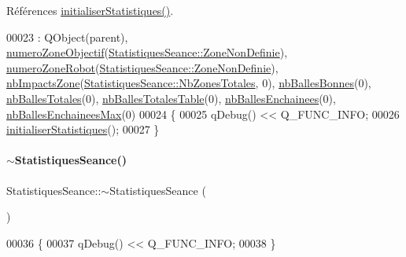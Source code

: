 Références \hyperlink{class_statistiques_seance_a17e1c49e2986a8490ff96e4bd7733291}{initialiser\+Statistiques()}.


\begin{DoxyCode}
00023                                                       : QObject(parent), 
      \hyperlink{class_statistiques_seance_a23226867e4a34cb41f8c07f3d8d42e49}{numeroZoneObjectif}(\hyperlink{class_statistiques_seance_aa839f5192cbadd7c3fb3651d62eff8b5afaee4b0051f413cbba9651905daeba28}{StatistiquesSeance::ZoneNonDefinie}),
       \hyperlink{class_statistiques_seance_aeea50e7fc9b2308e365f77f27e3f86ee}{numeroZoneRobot}(\hyperlink{class_statistiques_seance_aa839f5192cbadd7c3fb3651d62eff8b5afaee4b0051f413cbba9651905daeba28}{StatistiquesSeance::ZoneNonDefinie}), 
      \hyperlink{class_statistiques_seance_aa4a040cda282d5b1c250025f8e191e20}{nbImpactsZone}(\hyperlink{class_statistiques_seance_aa839f5192cbadd7c3fb3651d62eff8b5afe19f73563963b5160847cdd8c2260c4}{StatistiquesSeance::NbZonesTotales}, 0), 
      \hyperlink{class_statistiques_seance_af62043be598fd6b7cd7ddbc37eadf967}{nbBallesBonnes}(0), \hyperlink{class_statistiques_seance_a27eb3965bbe304700d3254534c5e4ed3}{nbBallesTotales}(0), 
      \hyperlink{class_statistiques_seance_aa152a6f154cc832c3355342ecf94162a}{nbBallesTotalesTable}(0), \hyperlink{class_statistiques_seance_ac7f71fc7b017bb17d4576f954120c7a0}{nbBallesEnchainees}(0), 
      \hyperlink{class_statistiques_seance_a3e64397e87d453efb42b2545df1a8e90}{nbBallesEnchaineesMax}(0)
00024 \{
00025     qDebug() << Q\_FUNC\_INFO;
00026     \hyperlink{class_statistiques_seance_a17e1c49e2986a8490ff96e4bd7733291}{initialiserStatistiques}();
00027 \}
\end{DoxyCode}
\mbox{\label{class_statistiques_seance_a2e84d125a8d696fa74d9c356eb2b8cab}} 
\paragraph{\texorpdfstring{$\sim$\+Statistiques\+Seance()}{~StatistiquesSeance()}}
{\footnotesize\ttfamily Statistiques\+Seance\+::$\sim$\+Statistiques\+Seance (\begin{DoxyParamCaption}{ }\end{DoxyParamCaption})}


\begin{DoxyCode}
00036 \{
00037     qDebug() << Q\_FUNC\_INFO;
00038 \}
\end{DoxyCode}


